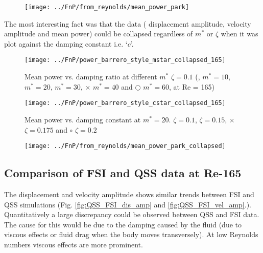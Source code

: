 \begin{figure}
\centering
\texttt{[image: ../FnP/from\_reynolds/mean\_power\_park]}
\caption{}
\label{fig:mean_power_park}
\end{figure}




The most interesting fact was that the data ( displacement amplitude, velocity amplitude and mean power) could be collapsed regardless of $m^*$ or $\zeta$ when it was plot against the damping constant i.e. `$c$'.

\begin{figure}
\centering
\texttt{[image: ../FnP/power\_barrero\_style\_mstar\_collapsed\_165]}
\caption{Mean power vs. damping ratio at different $m^*$ $\zeta=0.1$ (, $m^*=10$, $m^*=20$,  $m^*=30$, $\times$ $m^*=40$ and  $\bigcirc$ $m^* = 60$, at Re = 165) } 
\label{fig:power_barrero_style_mstar_collapsed_165}
\end{figure}


\begin{figure}
\centering
\texttt{[image: ../FnP/power\_barrero\_style\_cstar\_collapsed\_165]}
\caption{Mean power vs. damping constant at $m^*=20$.  $ \zeta = 0.1$,  $\zeta = 0.15$,   $\times$ $\zeta = 0.175$ and $\circ$ $\zeta = 0.2$}
\label{fig:power_barrero_style_cstar_collapsed_165}
\end{figure}


\begin{figure}
\centering
\texttt{[image: ../FnP/from\_reynolds/mean\_power\_park\_collapsed]}
\caption{}
\label{fig:mean_power_park_collapsed}
\end{figure}




\subsection{Comparison of FSI and QSS data at Re-165}

The displacement and velocity amplitude shows similar trends between FSI and QSS simulations (Fig. \ref{fig:QSS_FSI_dis_amp} and \ref{fig:QSS_FSI_vel_amp}.). Quantitatively a large discrepancy  could be observed between QSS and FSI data. The cause for this would be  due to the damping caused by the fluid (due to viscous effects or fluid drag when the body moves transversely). At low Reynolds numbers viscous effects are more prominent.


